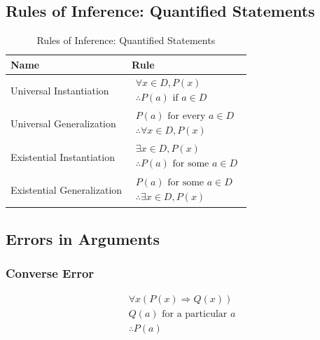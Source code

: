 \documentclass{article}
\theoremstyle{plain}
\theoremstyle{definition}
\theoremstyle{remark}
\begin{document}
\subsection{Rules of Inference: Quantified Statements}

\begin{table}[H]
    \centering
    \begin{tabular}{ll} 
        \toprule
        \textbf{Name} & \textbf{Rule} \\ 
        \midrule 
        Universal Instantiation & 
        $\begin{array}{l}
            \forall x \in D, P(x) \\
            \hline
            \therefore P(a) \text{ if } a \in D
        \end{array}$ \\ 
        \addlinespace
        Universal Generalization & 
        $\begin{array}{l}
            P(a) \text{ for every } a \in D \\
            \hline
            \therefore \forall x \in D, P(x)
        \end{array}$ \\ 
        \addlinespace
        Existential Instantiation & 
        $\begin{array}{l}
            \exists x \in D, P(x) \\
            \hline
            \therefore P(a) \text{ for some } a \in D
        \end{array}$ \\ 
        \addlinespace
        Existential Generalization & 
        $\begin{array}{l}
            P(a) \text{ for some } a \in D \\
            \hline
            \therefore \exists x \in D, P(x)
        \end{array}$ \\ 
        \bottomrule
    \end{tabular}
    \caption{Rules of Inference: Quantified Statements}
    \label{tab:roiqs}
\end{table}

\subsection{Errors in Arguments}

\subsubsection{Converse Error}
\[
\begin{array}{l}
    \forall x (P(x) \Rightarrow Q(x)) \\
    Q(a) \text{ for a particular } a \\
    \hline
    \therefore P(a)
\end{array}
\]
\end{document}
